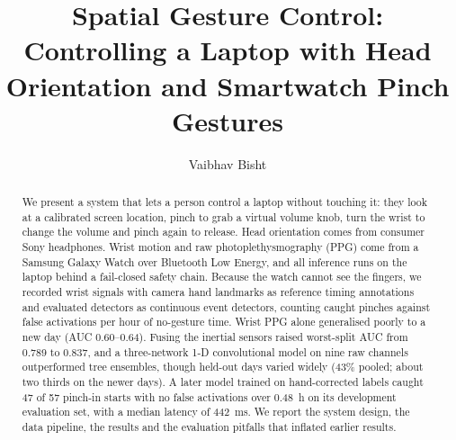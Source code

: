 \documentclass[runningheads]{llncs}
\begin{document}
\title{Spatial Gesture Control: Controlling a Laptop with Head Orientation and Smartwatch Pinch Gestures}

\author{Vaibhav Bisht}

\maketitle

\begin{abstract}
We present a system that lets a person control a laptop without touching it: they look at a calibrated screen location, pinch to grab a virtual volume knob, turn the wrist to change the volume and pinch again to release. Head orientation comes from consumer Sony headphones. Wrist motion and raw photoplethysmography (PPG) come from a Samsung Galaxy Watch over Bluetooth Low Energy, and all inference runs on the laptop behind a fail-closed safety chain. Because the watch cannot see the fingers, we recorded wrist signals with camera hand landmarks as reference timing annotations and evaluated detectors as continuous event detectors, counting caught pinches against false activations per hour of no-gesture time. Wrist PPG alone generalised poorly to a new day (AUC 0.60--0.64). Fusing the inertial sensors raised worst-split AUC from 0.789 to 0.837, and a three-network 1-D convolutional model on nine raw channels outperformed tree ensembles, though held-out days varied widely (43\% pooled; about two thirds on the newer days). A later model trained on hand-corrected labels caught 47 of 57 pinch-in starts with no false activations over 0.48~h on its development evaluation set, with a median latency of 442~ms. We report the system design, the data pipeline, the results and the evaluation pitfalls that inflated earlier results.

\end{abstract}





\end{document}

